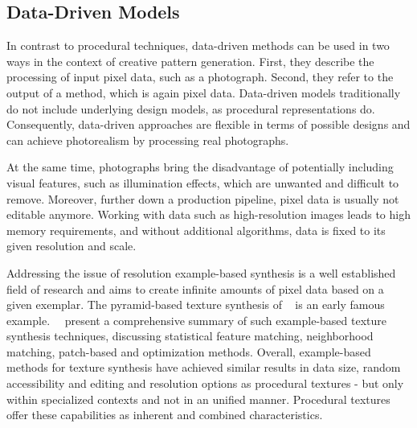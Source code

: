 


\subsection[Data-Driven]{Data-Driven Models}
\label{subsec:design_models_datadriven}

In contrast to procedural techniques, data-driven methods can be used in two ways in the context of creative pattern generation. First, they describe the processing of input pixel data, such as a photograph. Second, they refer to the output of a method, which is again pixel data. Data-driven models traditionally do not include underlying design models, as procedural representations do. Consequently, data-driven approaches are flexible in terms of possible designs and can achieve photorealism by processing real photographs.

At the same time, photographs bring the disadvantage of potentially including visual features, such as illumination effects, which are unwanted and difficult to remove. Moreover, further down a production pipeline, pixel data is usually not editable anymore. Working with data such as high-resolution images leads to high memory requirements, and without additional algorithms, data is fixed to its given resolution and scale.

Addressing the issue of resolution example-based synthesis is a well established field of research and aims to create infinite amounts of pixel data based on a given exemplar. The pyramid-based texture synthesis of \citeauthor*{heeger_1995_pbt}~\cite{heeger_1995_pbt} is an early famous example.~\citeauthor*{wei_2009_seb}~\cite{wei_2009_seb} present a comprehensive summary of such example-based texture synthesis techniques, discussing statistical feature matching, neighborhood matching, patch-based and optimization methods. Overall, example-based methods for texture synthesis have achieved similar results in data size, random accessibility and editing and resolution options as procedural textures - but only within specialized contexts and not in an unified manner. Procedural textures offer these capabilities as inherent and combined characteristics.

